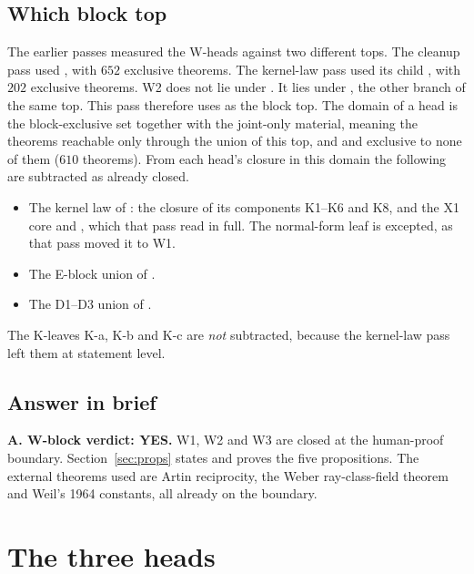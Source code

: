 \documentclass[11pt]{article}
\theoremstyle{remark}
\begin{document}
\subsection{Which block top}
The earlier passes measured the W-heads against two different tops. The cleanup pass used , with $652$ exclusive theorems. The kernel-law pass used its child , with $202$ exclusive theorems. W2 does not lie under . It lies under , the other branch of the same top. This pass therefore uses  as the block top. The domain of a head is the block-exclusive set together with the joint-only material, meaning the theorems reachable only through the union of this top,  and  and exclusive to none of them ($610$ theorems). From each head's closure in this domain the following are subtracted as already closed.
\begin{itemize}[leftmargin=*,itemsep=1pt]
\item The kernel law of : the closure of its components K1--K6 and K8, and the X1 core  and , which that pass read in full. The normal-form leaf  is excepted, as that pass moved it to W1.
\item The E-block union of .
\item The D1--D3 union of .
\end{itemize}
The K-leaves K-a, K-b and K-c are \emph{not} subtracted, because the kernel-law pass left them at statement level.

\subsection{Answer in brief}
\textbf{A. W-block verdict: YES.} W1, W2 and W3 are closed at the human-proof boundary. Section~\ref{sec:props} states and proves the five propositions. The external theorems used are Artin reciprocity, the Weber ray-class-field theorem and Weil's 1964 constants, all already on the boundary.

\section{The three heads}\label{sec:id}
\end{document}
